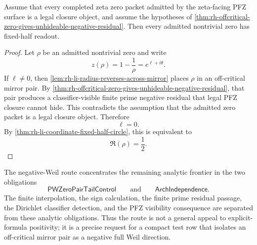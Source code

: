 \begin{corollary}
\label{cor:rh-negative-weil-conditional-fixed-half-readout}
Assume that every completed zeta zero packet admitted by the
zeta-facing PFZ surface is a legal closure object, and assume the
hypotheses of
\autoref{thm:rh-offcritical-zero-gives-unhideable-negative-residual}.
Then every admitted nontrivial zero has fixed-half readout.
\end{corollary}

\begin{proof}
Let $\rho$ be an admitted nontrivial zero and write
$$
z(\rho)=1-\frac1\rho=e^{\ell+i\theta}.
$$
If $\ell\ne0$, then \autoref{lem:rh-li-radius-reverses-across-mirror}
places $\rho$ in an off-critical mirror pair.  By
\autoref{thm:rh-offcritical-zero-gives-unhideable-negative-residual},
that pair produces a classifier-visible finite prime negative residual
that legal PFZ closure cannot hide.  This contradicts the assumption
that the admitted zero packet is a legal closure object.  Therefore
$$
\ell=0.
$$
By \autoref{thm:rh-li-coordinate-fixed-half-circle}, this is equivalent
to
$$
\Re(\rho)=\frac12.
$$
\end{proof}

\begin{principle}
\label{prin:rh-negative-weil-remaining-analytic-frontier}
The negative-Weil route concentrates the remaining analytic frontier in
the two obligations
$$
\mathsf{PWZeroPairTailControl}
\qquad
\text{and}
\qquad
\mathsf{ArchIndependence}.
$$
The finite interpolation, the sign calculation, the finite prime
residual passage, the Dirichlet classifier detection, and the PFZ
visibility consequence are separated from these analytic obligations.
Thus the route is not a general appeal to explicit-formula positivity;
it is a precise request for a compact test row that isolates an
off-critical mirror pair as a negative full Weil direction.
\end{principle}
